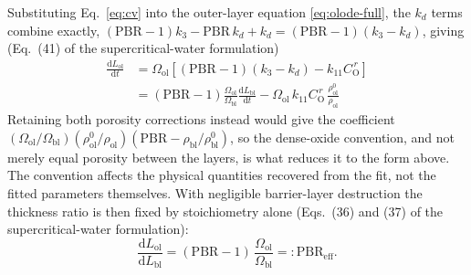 Substituting Eq.~\eqref{eq:cv} into the outer-layer equation
\eqref{eq:olode-full}, the $k_d$ terms combine exactly,
$(\mathrm{PBR}-1) k_3 - \mathrm{PBR}\, k_d + k_d
= (\mathrm{PBR}-1)(k_3 - k_d)$, giving
(Eq.~(41) of the supercritical-water formulation)
\begin{equation}
\boxed{\;
\begin{aligned}
\frac{\mathrm{d}L_{\mathrm{ol}}}{\mathrm{d}t}
&= \Omega_{\mathrm{ol}} \left[ (\mathrm{PBR}-1)(k_3 - k_d)
- k_{11} C_{\mathrm{O}}^{\,r} \right] \\
&= (\mathrm{PBR}-1) \frac{\Omega_{\mathrm{ol}}}{\Omega_{\mathrm{bl}}}
\frac{\mathrm{d}L_{\mathrm{bl}}}{\mathrm{d}t}
- \Omega_{\mathrm{ol}}\, k_{11} C_{\mathrm{O}}^{\,r}\,
\frac{\rho^0_{\mathrm{ol}}}{\rho_{\mathrm{ol}}}
\end{aligned}
\;}
\label{eq:olode}
\end{equation}
Retaining both porosity corrections instead would give the coefficient
$(\Omega_{\mathrm{ol}}/\Omega_{\mathrm{bl}})
(\rho^0_{\mathrm{ol}}/\rho_{\mathrm{ol}})
(\mathrm{PBR} - \rho_{\mathrm{bl}}/\rho^0_{\mathrm{bl}})$, so the dense-oxide
convention, and not merely equal porosity between the layers, is what
reduces it to the form above. The convention affects the physical
quantities recovered from the fit, not the fitted parameters themselves.
With negligible barrier-layer destruction the thickness ratio is then fixed
by stoichiometry alone (Eqs.~(36) and (37) of the supercritical-water
formulation):
\begin{equation}
\frac{\mathrm{d}L_{\mathrm{ol}}}{\mathrm{d}L_{\mathrm{bl}}}
= (\mathrm{PBR}-1)\, \frac{\Omega_{\mathrm{ol}}}{\Omega_{\mathrm{bl}}}
=: \mathrm{PBR}_{\mathrm{eff}} .
\end{equation}

